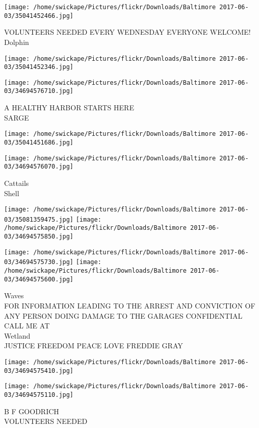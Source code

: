 \documentclass[10pt,letterpaper]{article}
\begin{document}
\vspace{0.25in}
\texttt{[image: /home/swickape/Pictures/flickr/Downloads/Baltimore 2017-06-03/35041452466.jpg]}

VOLUNTEERS NEEDED EVERY WEDNESDAY EVERYONE WELCOME!\\
Dolphin
\pagebreak

\texttt{[image: /home/swickape/Pictures/flickr/Downloads/Baltimore 2017-06-03/35041452346.jpg]}

\vspace{0.25in}
\texttt{[image: /home/swickape/Pictures/flickr/Downloads/Baltimore 2017-06-03/34694576710.jpg]}

A HEALTHY HARBOR STARTS HERE\\
SARGE
\pagebreak

\texttt{[image: /home/swickape/Pictures/flickr/Downloads/Baltimore 2017-06-03/35041451686.jpg]}

\vspace{0.25in}
\texttt{[image: /home/swickape/Pictures/flickr/Downloads/Baltimore 2017-06-03/34694576070.jpg]}

Cattails\\
Shell
\pagebreak

\texttt{[image: /home/swickape/Pictures/flickr/Downloads/Baltimore 2017-06-03/35081359475.jpg]}
\texttt{[image: /home/swickape/Pictures/flickr/Downloads/Baltimore 2017-06-03/34694575850.jpg]}

\texttt{[image: /home/swickape/Pictures/flickr/Downloads/Baltimore 2017-06-03/34694575730.jpg]}
\texttt{[image: /home/swickape/Pictures/flickr/Downloads/Baltimore 2017-06-03/34694575600.jpg]}

Waves\\
FOR INFORMATION LEADING TO THE ARREST AND CONVICTION OF ANY PERSON DOING DAMAGE TO THE GARAGES CONFIDENTIAL CALL ME AT\\
Wetland\\
JUSTICE FREEDOM PEACE LOVE FREDDIE GRAY
\pagebreak

\texttt{[image: /home/swickape/Pictures/flickr/Downloads/Baltimore 2017-06-03/34694575410.jpg]}

\vspace{0.25in}
\texttt{[image: /home/swickape/Pictures/flickr/Downloads/Baltimore 2017-06-03/34694575110.jpg]}

B F GOODRICH\\
VOLUNTEERS NEEDED
\pagebreak
\end{document}
